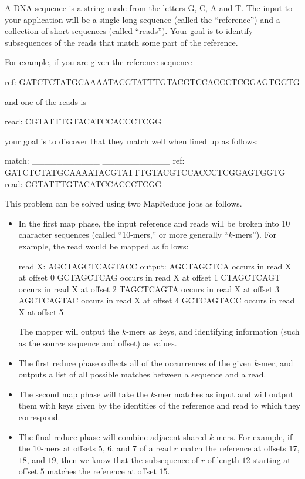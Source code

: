 \documentclass{pset}
\begin{document}
A DNA sequence is a string made from the letters G, C, A and T.  The input to
your application will be a single long sequence (called the ``reference'') and
a collection of short sequences (called ``reads'').  Your goal is to identify
subsequences of the reads that match some part of the reference.

For example, if you are given the reference sequence
\begin{ocaml}
ref:  GATCTCTATGCAAAATACGTATTTGTACGTCCACCCTCGGAGTGGTG
\end{ocaml}
and one of the reads is
\begin{ocaml}
read: CGTATTTGTACATCCACCCTCGG
\end{ocaml}
your goal is to discover that they match well when lined up as follows:
\begin{ocaml}
match:                 ___________ ___________
ref:  GATCTCTATGCAAAATACGTATTTGTACGTCCACCCTCGGAGTGGTG
read:                  CGTATTTGTACATCCACCCTCGG
\end{ocaml}

This problem can be solved using two MapReduce jobs as follows. \begin{itemize}

\item In the first map phase, the input reference and reads will be broken into
10 character sequences (called ``10-mers,'' or more generally ``$k$-mers'').
For example, the read  would be mapped as follows:

\begin{ocaml}
read X: AGCTAGCTCAGTACC
output: AGCTAGCTCA       occurs in read X at offset 0
         GCTAGCTCAG      occurs in read X at offset 1
          CTAGCTCAGT     occurs in read X at offset 2
           TAGCTCAGTA    occurs in read X at offset 3
            AGCTCAGTAC   occurs in read X at offset 4
             GCTCAGTACC  occurs in read X at offset 5
\end{ocaml}

The mapper will output the $k$-mers as keys, and identifying information (such
as the source sequence and offset) as values.

\item The first reduce phase collects all of the occurrences of the given
$k$-mer, and outputs a list of all possible matches between a sequence and a
read.

\item The second map phase will take the $k$-mer matches as input and will
output them with keys given by the identities of the reference and read to which
they correspond.

\item The final reduce phase will combine adjacent shared $k$-mers.  For
example, if the $10$-mers at offsets $5$, $6$, and $7$ of a read $r$ match the
reference at offsets $17$, $18$, and $19$, then we know that the subsequence of
$r$ of length $12$ starting at offset $5$ matches the reference at offset $15$.
\end{itemize}
\end{document}
